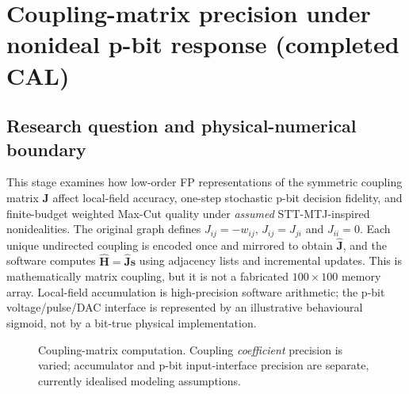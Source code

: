 \section{Coupling-matrix precision under nonideal p-bit response (completed CAL)}
\label{sec:cal-matrix}
\subsection{Research question and physical-numerical boundary}
This stage examines how low-order FP representations of the symmetric
coupling matrix $\mathbf J$ affect local-field accuracy, one-step
stochastic p-bit decision fidelity, and finite-budget weighted
Max-Cut quality under \emph{assumed} STT-MTJ-inspired nonidealities.
The original graph defines $J_{ij}=-w_{ij}$, $J_{ij}=J_{ji}$ and $J_{ii}=0$.
Each unique undirected coupling is encoded once and mirrored to obtain
$\widehat{\mathbf J}$, and the software computes
$\widehat{\mathbf H}=\widehat{\mathbf J}\mathbf s$
using adjacency lists and incremental updates. This is mathematically
matrix coupling, but it is not a fabricated $100\times100$ memory array.
Local-field accumulation is high-precision software arithmetic; the
p-bit voltage/pulse/DAC interface is represented by an illustrative
behavioural sigmoid, not by a bit-true physical implementation.

\begin{figure}[htbp]\centering
{}
\caption{Coupling-matrix computation. Coupling \emph{coefficient} precision
is varied; accumulator and p-bit input-interface precision are separate,
currently idealised modeling assumptions.}\label{fig:coupling-pipeline}
\end{figure}

